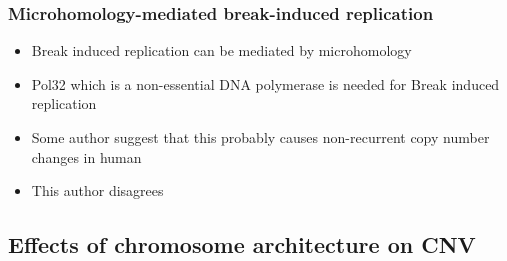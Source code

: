 \documentclass[]{book}
\providecommand{\tightlist}{%
  \setlength{\itemsep}{0pt}\setlength{\parskip}{0pt}}
\begin{document}
\hypertarget{microhomology-mediated-break-induced-replication}{%
\subsubsection{Microhomology-mediated break-induced replication}\label{microhomology-mediated-break-induced-replication}}

\begin{itemize}
\tightlist
\item
  Break induced replication can be mediated by microhomology
\item
  Pol32 which is a non-essential DNA polymerase is needed for Break induced replication
\item
  Some author suggest that this probably causes non-recurrent copy number changes in human
\item
  This author disagrees
\end{itemize}

\hypertarget{effects-of-chromosome-architecture-on-cnv}{%
\subsection{Effects of chromosome architecture on CNV}\label{effects-of-chromosome-architecture-on-cnv}}
\end{document}
